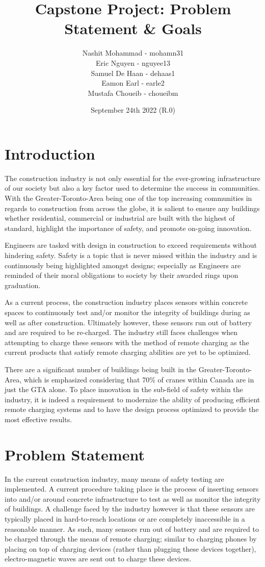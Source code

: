 \documentclass[12pt,a4]{report}
\title{Capstone Project: Problem Statement \& Goals}
\author{Nashit Mohammad - mohamn31\\Eric Nguyen - nguyee13\\Samuel De Haan - dehaas1\\Eamon Earl - earle2\\Mustafa Choueib - choueibm}
\date{September 24th 2022 (R.0)}
\begin{document}
\maketitle
\newpage

\section*{Introduction}
The construction industry is not only essential for the ever-growing infrastructure of our society but also a key factor used to determine the success in communities. With the Greater-Toronto-Area being one of the top increasing communities in regards to construction from across the globe, it is salient to ensure any buildings whether residential, commercial or industrial are built with the highest of standard, highlight the importance of safety, and promote on-going innovation.

Engineers are tasked with design in construction to exceed requirements without hindering safety. Safety is a topic that is never missed within the industry and is continuously being highlighted amongst designs; especially as Engineers are reminded of their moral obligations to society by their awarded rings upon graduation. 

As a current process, the construction industry places sensors within concrete spaces to continuously test and/or monitor the integrity of buildings during as well as after construction. Ultimately however, these sensors run out of battery and are required to be re-charged. The industry still faces challenges when attempting to charge these sensors with the method of remote charging as the current products that satisfy remote charging abilities are yet to be optimized. 

There are a significant number of buildings being built in the Greater-Toronto-Area, which is emphasized considering that 70\% of cranes within Canada are in just the GTA alone. To place innovation in the sub-field of safety within the industry, it is indeed a requirement to modernize the ability of producing efficient remote charging systems and to have the design process optimized to provide the most effective results. 

\section*{Problem Statement}
In the current construction industry, many means of safety testing are implemented. A current procedure taking place is the process of inserting sensors into and/or around concrete infrastructure to test as well as monitor the integrity of buildings. A challenge faced by the industry however is that these sensors are typically placed in hard-to-reach locations or are completely inaccessible in a reasonable manner. As such, many sensors run out of battery and are required to be charged through the means of remote charging; similar to charging phones by placing on top of charging devices (rather than plugging these devices together), electro-magnetic waves are sent out to charge these devices. 
\end{document}
